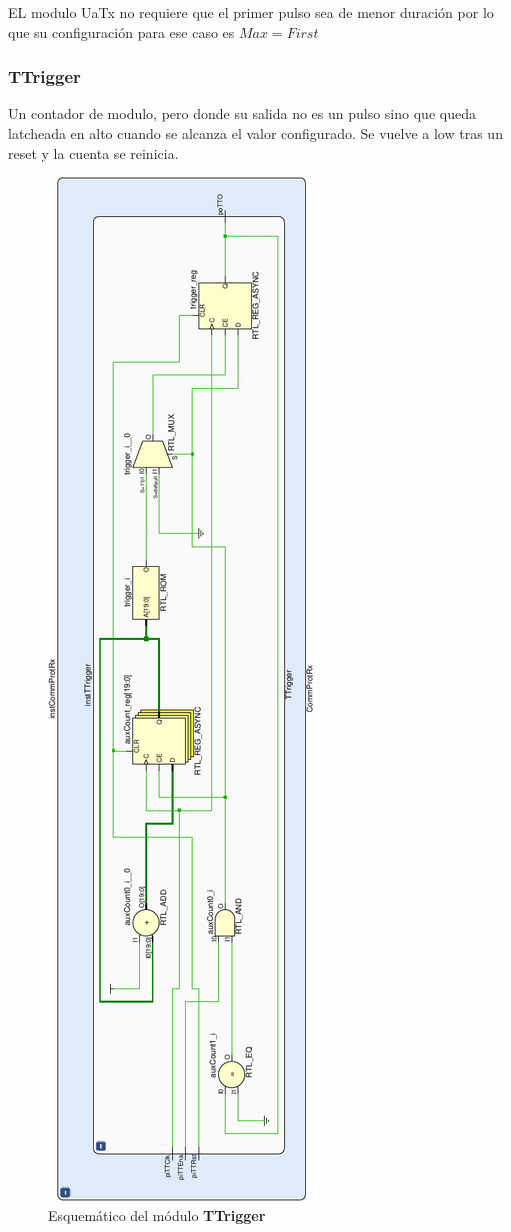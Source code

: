 \documentclass[12pt]{article}
\begin{document}
EL modulo UaTx no requiere que el primer pulso sea de menor duración por lo que su configuración para ese caso es $Max = First$
\subsubsection{TTrigger}
Un contador de modulo, pero donde su salida no es un pulso sino que queda latcheada en alto cuando se alcanza el valor configurado. Se vuelve a low tras un reset y la cuenta se reinicia.

\begin{figure}[H]
    \centering
    \includegraphics[angle=270, width=\textwidth]{ttrigger-crop}
    \caption{Esquemático del módulo \textbf{TTrigger}}
\end{figure}
\end{document}
